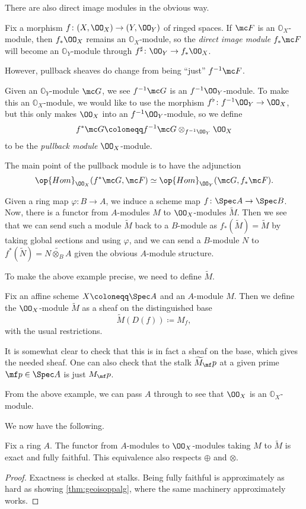 \documentclass[../notes.tex]{subfiles}
\begin{document}
There are also direct image modules in the obvious way.
\begin{definition}
	Fix a morphism $f\colon(X,\OO_X)\to(Y,\OO_Y)$ of ringed spaces. If $\mc F$ is an $\mathbb O_X$-module, then $f_*\OO_X$ remains an $\mathbb O_X$-module, so the \textit{direct image module} $f_*\mc F$ will become an $\mathbb O_Y$-module through $f^\sharp\colon\OO_Y\to f_*\OO_X$.
\end{definition}
However, pullback sheaves do change from being ``just'' $f^{-1}\mc F$.
\begin{definition}
	Given an $\mathbb O_Y$-module $\mc G$, we see $f^{-1}\mc G$ is an $f^{-1}\OO_Y$-module. To make this an $\mathbb O_X$-module, we would like to use the morphism $f^\flat\colon f^{-1}\OO_Y\to\OO_X$, but this only makes $\OO_X$ into an $f^{-1}\OO_Y$-module, so we define
	\[f^*\mc G\coloneqq f^{-1}\mc G\otimes_{f^{-1}\OO_Y}\OO_X\]
	to be the \textit{pullback module} $\OO_X$-module.
\end{definition}
\begin{remark}
	The main point of the pullback module is to have the adjunction
	\[\op{Hom}_{\OO_X}(f^*\mc G,\mc F)\simeq\op{Hom}_{\OO_Y}(\mc G,f_*\mc F).\]
\end{remark}
\begin{example}
	Given a ring map $\varphi\colon B\to A$, we induce a scheme map $f\colon\Spec A\to\Spec B$. Now, there is a functor from $A$-modules $M$ to $\OO_X$-modules $\widetilde M$. Then we see that we can send such a module $\widetilde M$ back to a $B$-module as $f_*(\widetilde M)=\widetilde M$ by taking global sections and using $\varphi$, and we can send a $B$-module $N$ to $f^*(\widetilde N)=\widetilde{N\otimes_BA}$ given the obvious $A$-module structure.
\end{example}
To make the above example precise, we need to define $\widetilde M$.
\begin{definition}
	Fix an affine scheme $X\coloneqq\Spec A$ and an $A$-module $M$. Then we define the $\OO_X$-module $\widetilde M$ as a sheaf on the distinguished base
	\[\widetilde M(D(f))\coloneqq M_f,\]
	with the usual restrictions.
\end{definition}
It is somewhat clear to check that this is in fact a sheaf on the base, which gives the needed sheaf. One can also check that the stalk $\widetilde M_\mf p$ at a given prime $\mf p\in\Spec A$ is just $M_\mf p$.
\begin{example}
	From the above example, we can pass $A$ through to see that $\OO_X$ is an $\mathbb O_X$-module.
\end{example}
We now have the following.
\begin{proposition}
	Fix a ring $A$. The functor from $A$-modules to $\OO_X$-modules taking $M$ to $\widetilde M$ is exact and fully faithful. This equivalence also respects $\oplus$ and $\otimes$.
\end{proposition}
\begin{proof}
	Exactness is checked at stalks. Being fully faithful is approximately as hard as showing \autoref{thm:geoisoppalg}, where the same machinery approximately works.
\end{proof}
\end{document}
